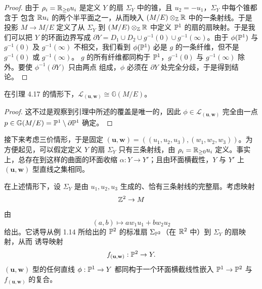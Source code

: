 \begin{proof}
由于 $\rho_i = \mathbb{R}_{\ge0}u_i$ 是定义 $Y$ 的扇 $\Sigma_Y$ 中的锥，且 $u_2 = -u_1$，$\Sigma_Y$ 中每个锥都含于
包含 $\mathbb{R} u_i$ 的两个半平面之一，从而映入 $(M/E)\otimes_{\mathbb{Z}}\mathbb{R}$ 中的一条射线。于是投影 $M\to M/E$ 定义了从
$\Sigma_Y$ 到 $(M/E)\otimes_{\mathbb{Z}}\mathbb{R}$ 中定义 $\mathbb{P}^1$ 的扇的扇映射。于是我们可以把 $Y$ 的环面边界写成
$\partial Y = D_1\cup D_2\cup g^{-1}(0)\cup g^{-1}(\infty)$。由于 $\phi(\mathbb{P}^1)$ 与 $g^{-1}(0)$ 及
$g^{-1}(\infty)$ 不相交，我们看到 $\phi(\mathbb{P}^1)$ 必是 $g$ 的一条纤维，但不是 $g^{-1}(0)$ 或 $g^{-1}(\infty)$。
$g$ 的所有纤维都同构于 $\mathbb{P}^1$，$g^{-1}(0)$ 与 $g^{-1}(\infty)$ 除外。要使 $\phi^{-1}(\partial Y)$ 只由两点
组成，$\phi$ 必须在 $\partial Y$ 处完全分歧，于是得到结论。
\end{proof}

\begin{corollary}
在引理 4.17 的情形下，$\mathcal{L}_{(\mathbf{u},\mathbf{w})} \cong \mathbb{G}(M/E)$。
\end{corollary}

\begin{proof}
这不过是观察到引理中所述的覆盖是唯一的，因此 $\phi\in\mathcal{L}_{(\mathbf{u},\mathbf{w})}$ 完全由一点
$p\in\mathbb{G}(M/E) = \mathbb{P}^1\setminus\partial\mathbb{P}^1$ 确定。
\end{proof}

接下来考虑三价情形，于是固定
$(\mathbf{u},\mathbf{w}) = ((u_1,u_2,u_3),(w_1,w_2,w_3))$。为方便起见，可以假定定义 $Y$ 的扇
$\Sigma_Y$ 只有三条射线，由 $\rho_i = \mathbb{R}_{\ge0}u_i$ 定义。事实上，总存在到这样的曲面的环面收缩
$\alpha : Y \to Y'$；且由环面横截性，$Y$ 与 $Y'$ 上 $(\mathbf{u},\mathbf{w})$ 型直线之集相同。

\begin{lemma}
在上述情形下，设 $\Sigma_Y$ 是由 $u_1,u_2,u_3$ 生成的、恰有三条射线的完整扇。考虑映射
\[
\mathbb{Z}^2 \to M
\]
由
\[
(a,b) \mapsto aw_1u_1+bw_2u_2
\]
给出。它诱导从例 1.14 所给出的 $\mathbb{P}^2$ 的标准扇 $\Sigma_{\mathbb{P}^2}$（在 $\mathbb{R}^2$ 中）到 $\Sigma_Y$ 的扇映射，从而
诱导映射
\[
f_{(\mathbf{u},\mathbf{w})} : \mathbb{P}^2 \to Y.
\]
$(\mathbf{u},\mathbf{w})$ 型的任何直线 $\phi : \mathbb{P}^1 \to Y$ 都同构于一个环面横截线性嵌入
$\mathbb{P}^1 \to \mathbb{P}^2$ 与 $f_{(\mathbf{u},\mathbf{w})}$ 的复合。
\end{lemma}

